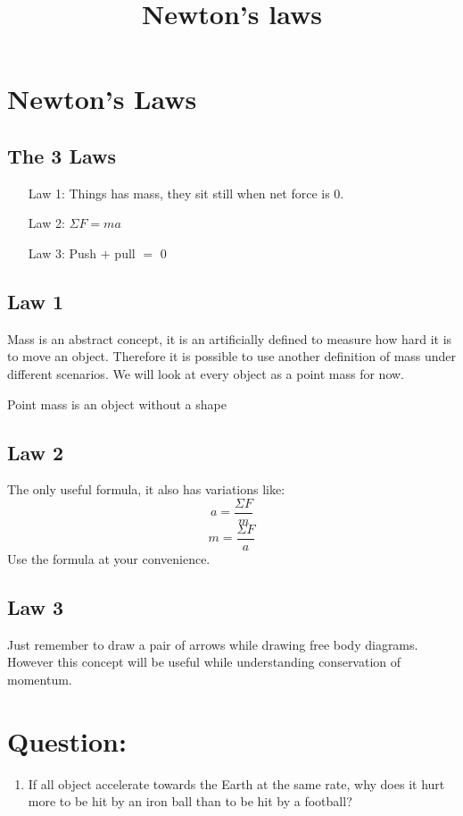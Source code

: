 \documentclass[]{article}
\title{Newton's laws}
\author{}
\begin{document}
\maketitle

\section{Newton's Laws}
	\subsection{The 3 Laws}
	\begin{enumerate}
		\item[Law 1:] Things has mass, they sit still when net force is 0. 
		\item[Law 2:] $\Sigma F=ma$
		\item[Law 3:] Push $+$ pull $=$ $0$
	\end{enumerate}
	\subsection{Law 1}
		Mass is an abstract concept, it is an artificially defined to measure how hard it is to move an object. Therefore it is possible to use another definition of mass under different scenarios. We will look at every object as a point mass for now.
		
		Point mass is an object without a shape
	\subsection{Law 2}
		The only useful formula, it also has variations like:
		$$a= \frac{\Sigma F}{m}$$
		$$m = \frac{\Sigma F} {a}$$
		Use the formula at your convenience.
	\subsection{Law 3}
		Just remember to draw a pair of arrows while drawing free body diagrams. However this concept will be useful while understanding conservation of momentum.
	
	\section{Question:}
	\begin{enumerate}
		\item If all object accelerate towards the Earth at the same rate, why does it hurt more to be hit by an iron ball than to be hit by a football?
	\end{enumerate}
\end{document}
